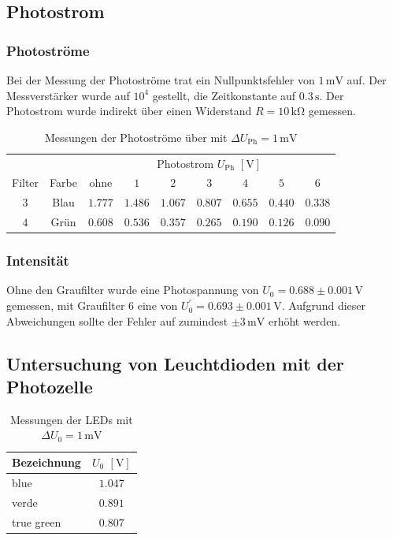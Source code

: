 \documentclass[12pt,a4paper]{scrartcl}
\numberwithin{equation}{section} %
\begin{document}
\subsection{Photostrom}
\subsubsection{Photoströme}
Bei der Messung der Photoströme trat ein Nullpunktsfehler von $1\mathrm{\,mV}$ auf. Der Messverstärker wurde auf $10^4$ gestellt, die Zeitkonstante auf $0.3\mathrm{\,s}$. Der Photostrom wurde indirekt über einen Widerstand $R=10\mathrm{\,k\Omega}$ gemessen.

\begin{table}[h!]
	\centering
	\begin{tabular}{c|c|c|c|c|c|c|c|c}
		 	&& \multicolumn{7}{c}{Photostrom $U_\mathrm{Ph}$ $[\mathrm{V}]$} \\
		Filter & Farbe & ohne & $1$ & $2$ & $3$ & $4$ & $5$ & $6$ \\
		\hline
		$3$ & Blau & $1.777$ & $1.486$ & $1.067$ & $0.807$ & $0.655$ & $0.440$ & $0.338$ \\
		$4$ & Grün & $0.608$ & $0.536$ & $0.357$ & $0.265$ & $0.190$ & $0.126$ & $0.090$
	\end{tabular}
	\caption{Messungen der Photoströme über mit $\Delta U_\mathrm{Ph}=1\mathrm{\,mV}$}
	\label{tab:Photostrom}
\end{table}

\subsubsection{Intensität}
Ohne den Graufilter wurde eine Photospannung von $U_0=0.688\pm0.001\mathrm{\,V}$ gemessen, mit Graufilter $6$ eine von $U_0^\prime=0.693\pm0.001\mathrm{\,V}$. Aufgrund dieser Abweichungen sollte der Fehler auf zumindest $\pm 3\mathrm{\,mV}$ erhöht werden.

\subsection{Untersuchung von Leuchtdioden mit der Photozelle}
\begin{table}[h!]
	\centering
	\begin{tabular}{l|c}
		Bezeichnung & $U_0$ $[\mathrm{V}]$ \\
		\hline
		blue & $1.047$ \\
		verde & $0.891$ \\
		true green & $0.807$ \\
	\end{tabular}
	\caption{Messungen der LEDs mit $\Delta U_0=1\mathrm{\,mV}$}
	\label{tab:LEDs}
\end{table}
\end{document}
